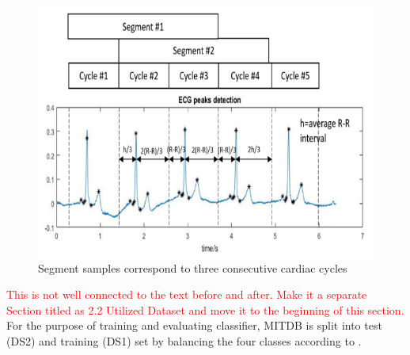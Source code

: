 \begin{figure}[t]
\centering
\includegraphics[scale=.8]{Fig/segment.png}
\caption{Segment samples correspond to three consecutive cardiac cycles}
\label{fig:interval}
\end{figure}


\textcolor{red}{This is not well connected to the text before and after. Make it a separate Section titled as 2.2 Utilized Dataset and move it to the beginning of this section.}
For the purpose of training and evaluating classifier, MITDB is split into test (DS2) and training (DS1) set by balancing the four classes according to \cite{autofs}. 




